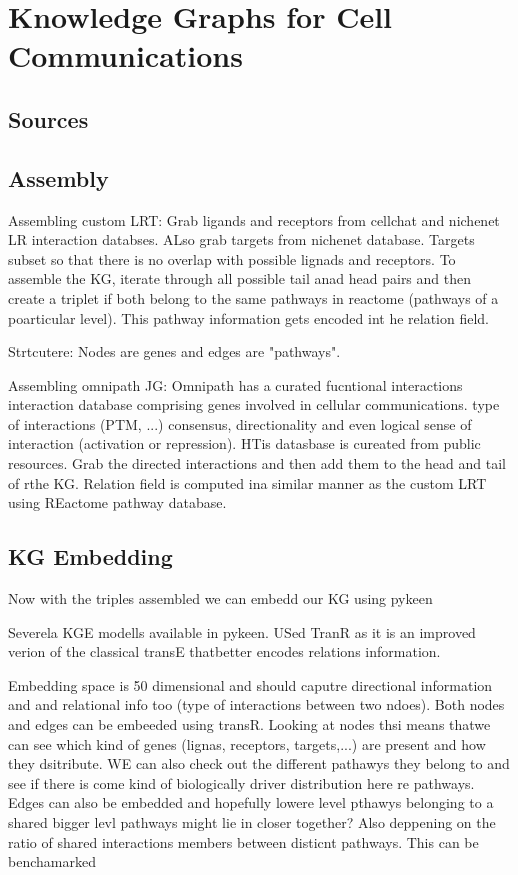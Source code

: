 \section{Knowledge Graphs for Cell Communications}

\subsection*{Sources}

\subsection*{Assembly}

Assembling custom LRT:
Grab ligands and receptors from cellchat and nichenet LR interaction databses. ALso grab targets from nichenet database.
Targets subset so that there is no overlap with possible lignads and receptors.
To assemble the KG, iterate through all possible tail anad head pairs and then create a triplet if both belong to the same pathways in reactome (pathways of a poarticular level).
This pathway information gets encoded int he relation field.

Strtcutere: Nodes are genes and edges are "pathways".


Assembling omnipath JG:
Omnipath has a curated fucntional interactions interaction database comprising genes involved in cellular communications. type of interactions (PTM, ...) consensus, directionality and even logical sense of interaction (activation or repression). HTis datasbase is cureated from public resources.
Grab the directed interactions and then add them to the head and tail of rthe KG. Relation field is computed ina  similar manner as the custom LRT using REactome pathway database.


\subsection*{KG Embedding}

Now with the triples assembled we can embedd our KG using pykeen

Severela KGE modells available in pykeen. USed TranR as it is an improved verion of the classical transE thatbetter encodes relations information. 

Embedding space is 50 dimensional and should caputre directional information and and relational info too (type of interactions between two ndoes).
Both nodes and edges can be embeeded using transR. 
Looking at nodes thsi means thatwe can see which kind of genes (lignas, receptors, targets,...) are present and how they dsitribute. WE can also check out the different pathawys they belong to and see if there is come kind of biologically driver distribution here re pathways.
Edges can also be embedded and hopefully lowere level pthawys belonging to a shared bigger levl pathways might lie in closer together? Also deppening on the ratio of shared interactions members between disticnt pathways. 
This can be benchamarked



